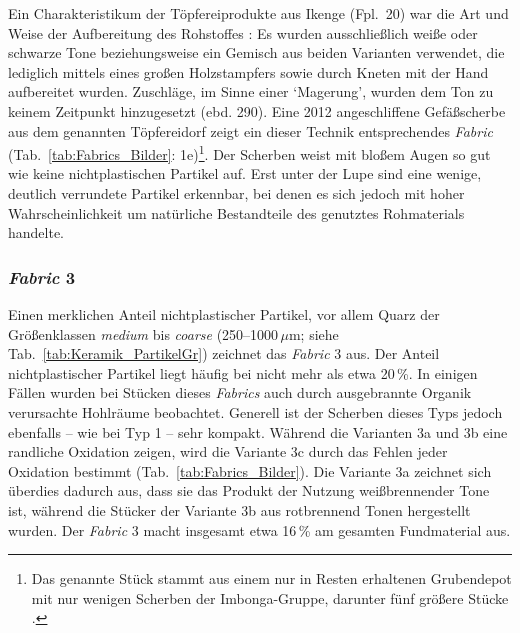 Ein Charakteristikum der Töpfereiprodukte aus Ikenge (Fpl.~20) war die Art und Weise der Aufbereitung des Rohstoffes \parencites{Eggert.1980c}{Wotzka.1991}: Es wurden ausschließlich weiße oder schwarze Tone beziehungsweise ein Gemisch aus beiden Varianten verwendet, die lediglich mittels eines großen Holzstampfers sowie durch Kneten mit der Hand aufbereitet wurden. Zuschläge, im Sinne einer \enquote*{Magerung}, wurden dem Ton zu keinem Zeitpunkt hinzugesetzt (ebd. 290). Eine 2012 angeschliffene Gefäßscherbe aus dem genannten Töpfereidorf zeigt ein dieser Technik entsprechendes \textit{Fabric} (Tab.~\ref{tab:Fabrics_Bilder}: 1e)\footnote{Das genannte Stück stammt aus einem nur in Resten erhaltenen Grubendepot mit nur wenigen Scherben der Imbonga-Gruppe, darunter fünf größere Stücke \parencite[332 Kat.-Nr.~22]{Wotzka.1995}.}. Der Scherben weist mit bloßem Augen so gut wie keine nichtplastischen Partikel auf. Erst unter der Lupe sind eine wenige, deutlich verrundete Partikel erkennbar, bei denen es sich jedoch mit hoher Wahrscheinlichkeit um natürliche Bestandteile des genutztes Rohmaterials handelte. 

\afterpage{%
	\clearpage
	
}

\subsubsection*{\textit{Fabric} 3}

Einen merklichen Anteil nichtplastischer Partikel, vor allem Quarz der Größenklassen \textit{medium} bis \textit{coarse} (250--1000\,$\mu$m; siehe Tab.~\ref{tab:Keramik_PartikelGr}) zeichnet das \textit{Fabric} 3 aus. Der Anteil nichtplastischer Partikel liegt häufig bei nicht mehr als etwa 20\,\%. In einigen Fällen wurden bei Stücken dieses \textit{Fabrics} auch durch ausgebrannte Organik verursachte Hohlräume beobachtet. Generell ist der Scherben dieses Typs jedoch ebenfalls -- wie bei Typ 1 -- sehr kompakt. Während die Varianten 3a und 3b eine randliche Oxidation zeigen, wird die Variante 3c durch das Fehlen jeder Oxidation bestimmt (Tab.~\ref{tab:Fabrics_Bilder}). Die Variante 3a zeichnet sich überdies dadurch aus, dass sie das Produkt der Nutzung weißbrennender Tone ist, während die Stücker der Variante 3b aus rotbrennend Tonen hergestellt wurden. Der \textit{Fabric} 3 macht insgesamt etwa 16\,\% am gesamten Fundmaterial aus.

